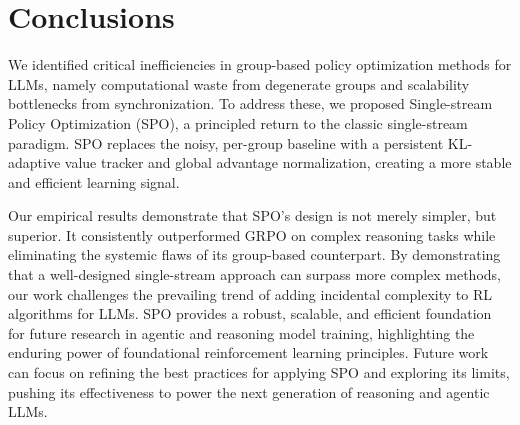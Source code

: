 \section{Conclusions}\label{sec:conclusion}

We identified critical inefficiencies in group-based policy optimization methods for LLMs, namely computational waste from degenerate groups and scalability bottlenecks from synchronization. To address these, we proposed Single-stream Policy Optimization (SPO), a principled return to the classic single-stream paradigm. SPO replaces the noisy, per-group baseline with a persistent KL-adaptive value tracker and global advantage normalization, creating a more stable and efficient learning signal.

Our empirical results demonstrate that SPO's design is not merely simpler, but superior. It consistently outperformed GRPO on complex reasoning tasks while eliminating the systemic flaws of its group-based counterpart. By demonstrating that a well-designed single-stream approach can surpass more complex methods, our work challenges the prevailing trend of adding incidental complexity to RL algorithms for LLMs. SPO provides a robust, scalable, and efficient foundation for future research in agentic and reasoning model training, highlighting the enduring power of foundational reinforcement learning principles. Future work can focus on refining the best practices for applying SPO and exploring its limits, pushing its effectiveness to power the next generation of reasoning and agentic LLMs.
